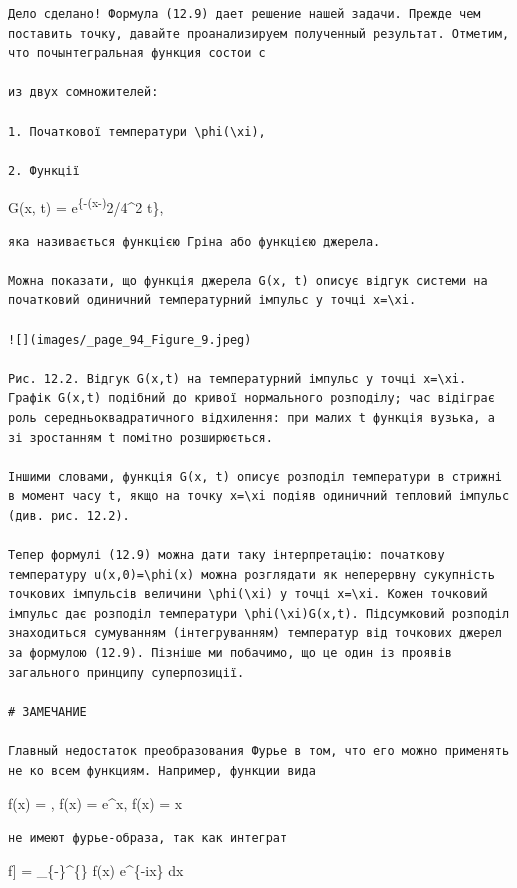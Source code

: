 \documentclass[
  ukrainian,
]{article}
\begin{document}
\begin{verbatim}
Дело сделано! Формула (12.9) дает решение нашей задачи. Прежде чем поставить точку, давайте проанализируем полученный результат. Отметим, что почынтегральная функция состои с

из двух сомножителей:

1. Початкової температури \phi(\xi),

2. Функції
\end{verbatim}

G(x, t) = 
e\textsuperscript{\{-(x-\xi)}2/4\alpha\^{}2 t\},

\begin{verbatim}
яка називається функцією Гріна або функцією джерела.

Можна показати, що функція джерела G(x, t) описує відгук системи на початковий одиничний температурний імпульс у точці x=\xi.

![](images/_page_94_Figure_9.jpeg)

Рис. 12.2. Відгук G(x,t) на температурний імпульс у точці x=\xi. Графік G(x,t) подібний до кривої нормального розподілу; час відіграє роль середньоквадратичного відхилення: при малих t функція вузька, а зі зростанням t помітно розширюється.

Іншими словами, функція G(x, t) описує розподіл температури в стрижні в момент часу t, якщо на точку x=\xi подіяв одиничний тепловий імпульс (див. рис. 12.2).

Тепер формулі (12.9) можна дати таку інтерпретацію: початкову температуру u(x,0)=\phi(x) можна розглядати як неперервну сукупність точкових імпульсів величини \phi(\xi) у точці x=\xi. Кожен точковий імпульс дає розподіл температури \phi(\xi)G(x,t). Підсумковий розподіл знаходиться сумуванням (інтегруванням) температур від точкових джерел за формулою (12.9). Пізніше ми побачимо, що це один із проявів загального принципу суперпозиції.

# ЗАМЕЧАНИЕ

Главный недостаток преобразования Фурье в том, что его можно применять не ко всем функциям. Например, функции вида
\end{verbatim}

f(x) = , f(x) = e\^{}x, f(x) = \sin x

\begin{verbatim}
не имеют фурье-образа, так как интеграт
\end{verbatim}

\mathcal{F}{[}f{]} =  \int\_\{-\pi\}\^{}\{\pi\}
f(x) e\^{}\{-i\xi x\} dx
\end{document}
